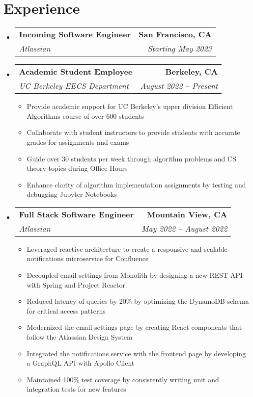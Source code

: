 \documentclass[letterpaper,11pt]{article}
\makeatletter
\newcommand{\resumeItem}[1]{
  \item\small{
    {#1 \vspace{-2pt}}
  }
}
\newcommand{\resumeSubheading}[4]{
  \vspace{-2pt}\item
    \begin{tabular*}{0.97\textwidth}[t]{l@{\extracolsep{\fill}}r}
      \textbf{#1} & #2 \\
      \textit{\small#3} & \textit{\small #4} \\
    \end{tabular*}\vspace{-7pt}
}
\newcommand{\resumeSubSubheading}[2]{
    \item
    \begin{tabular*}{0.97\textwidth}{l@{\extracolsep{\fill}}r}
      \textit{\small#1} & \textit{\small #2} \\
    \end{tabular*}\vspace{-7pt}
}
\newcommand{\resumeSubHeadingListStart}{\begin{itemize}[leftmargin=0.15in, label={}]}
\newcommand{\resumeSubHeadingListEnd}{\end{itemize}}
\newcommand{\resumeItemListStart}{\begin{itemize}}
\newcommand{\resumeItemListEnd}{\end{itemize}\vspace{-5pt}}
\makeatother
\begin{document}
\section{\textbf{Experience}}
  \resumeSubHeadingListStart
    \resumeSubheading
      {Incoming Software Engineer}{\textbf{San Francisco, CA}}
      {Atlassian}{Starting May 2023}
    \resumeSubheading
      {Academic Student Employee}{\textbf{Berkeley, CA}}
      {UC Berkeley EECS Department}{August 2022 -- Present}
      \resumeItemListStart
        \resumeItem{Provide academic support for UC Berkeley's upper division Efficient Algorithms course of over 600 students}
        \resumeItem{Collaborate with student instructors to provide students with accurate grades for assignments and exams}
        \resumeItem{Guide over 30 students per week through algorithm problems and CS theory topics during Office Hours}
        \resumeItem{Enhance clarity of algorithm implementation assignments by testing and debugging Jupyter Notebooks}
      \resumeItemListEnd

    \resumeSubheading
      {Full Stack Software Engineer}{\textbf{Mountain View, CA}}
      {Atlassian}{May 2022 -- August 2022}
      \resumeItemListStart
        \resumeItem{Leveraged reactive architecture to create a responsive and scalable notifications microservice for Confluence}
        \resumeItem{Decoupled email settings from Monolith by designing a new REST API with Spring and Project Reactor}
        \resumeItem{Reduced latency of queries by 20\% by optimizing the DynamoDB schema for critical access patterns}
        \resumeItem{Modernized the email settings page by creating React components that follow the Atlassian Design System}
        \resumeItem{Integrated the notifications service with the frontend page by developing a GraphQL API with Apollo Client}
        \resumeItem{Maintained 100\% test coverage by consistently writing unit and integration tests for new features}
      \resumeItemListEnd
      

  \resumeSubHeadingListEnd


\end{document}
